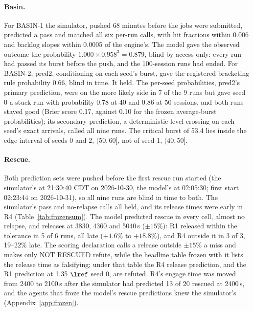 \paragraph{Basin.} For BASIN-1 the simulator, pushed 68 minutes before the jobs were submitted, predicted a pass and matched all six per-run calls, with hit fractions within 0.006 and backlog slopes within 0.0005\sps{} of the engine's. The model gave the observed outcome the probability $1.000\times0.958^3=0.879$, blind by access only: every run had passed its burst before the push, and the 100-session runs had ended. For BASIN-2, pred2, conditioning on each seed's burst, gave the registered bracketing rule probability 0.66, blind in time. It held. The per-seed probabilities, pred2's primary prediction, were on the more likely side in 7 of the 9 runs but gave seed 0 a stuck run with probability 0.78 at 40 and 0.86 at 50 sessions, and both runs stayed good (Brier score 0.17, against 0.10 for the frozen average-burst probabilities); its secondary prediction, a deterministic level crossing on each seed's exact arrivals, called all nine runs. The critical burst of 53.4 lies inside the edge interval of seeds 0 and 2, $(50,60]$, not of seed 1, $(40,50]$.

\paragraph{Rescue.} Both prediction sets were pushed before the first rescue run started (the simulator's at 21:30:40 CDT on 2026-10-30, the model's at 02:05:30; first start 02:23:44 on 2026-10-31), so all nine runs are blind in time to both. The simulator's pass and no-relapse calls all held, and its release times were early in R4 (Table~\ref{tab:frozensum}). The model predicted rescue in every cell, almost no relapse, and releases at 3830, 4360 and 5040\,s ($\pm15\%$): R1 released within the tolerance in 5 of 6 runs, all late ($+1.6\%$ to $+18.8\%$), and R4 outside it in 3 of 3, 19--22\% late. The scoring declaration calls a release outside $\pm15\%$ a miss and makes only NOT RESCUED refute, while the headline table frozen with it lists the release time as falsifying; under that table the R4 release prediction, and the R1 prediction at 1.35 $\lref$ seed 0, are refuted. R4's engage time was moved from 2400 to 2100\,s after the simulator had predicted 13 of 20 rescued at 2400\,s, and the agents that froze the model's rescue predictions knew the simulator's (Appendix~\ref{app:frozen}).

